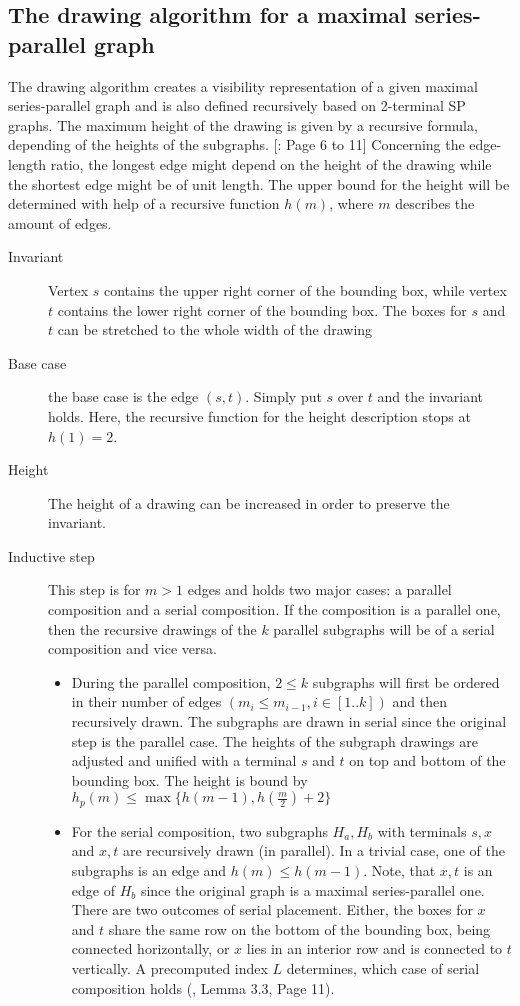 \subsection{The drawing algorithm for a maximal series-parallel graph}
The drawing algorithm creates a visibility representation of a given maximal series-parallel graph and is also defined recursively based on 2-terminal SP graphs. The maximum height of the drawing is given by a recursive formula, depending of the heights of the subgraphs. [\cite{DBLP:journals/dcg/Biedl11}: Page 6 to 11]
Concerning the edge-length ratio, the longest edge might depend on the height of the drawing while the shortest edge might be of unit length. The upper bound for the height will be determined with help of a recursive function $h(m)$, where $m$ describes the amount of edges.
\begin{description}
	\item[Invariant] Vertex $s$ contains the upper right corner of the bounding box, while vertex $t$ contains the lower right corner of the bounding box. The boxes for $s$ and $t$ can be stretched to the whole width of the drawing 
	\item[Base case] the base case is the edge $(s,t)$. Simply put $s$ over $t$ and the invariant holds. Here, the recursive function for the height description stops at $h(1) = 2$.
	\item[Height] The height of a drawing can be increased in order to preserve the invariant. 
	\item[Inductive step] This step is for $m>1$ edges and holds two major cases: a parallel composition and a serial composition. If the composition is a parallel one, then the recursive drawings of the $k$ parallel subgraphs will be of a serial composition and vice versa.
	\begin{itemize}
		\item During the parallel composition, $2\leq k$ subgraphs will first be ordered in their number of edges $(m_i \leq m_{i-1}, i \in[1..k])$ and then recursively drawn. The subgraphs are drawn in serial since the original step is the parallel case. The heights of the subgraph drawings are adjusted and unified with a terminal $s$ and $t$ on top and bottom of the bounding box. The height is bound by $h_p(m)\leq\max\{h(m-1),h\left(\frac{m}{2}\right)+2\}$
		\item For the serial composition, two subgraphs $H_a, H_b$ with terminals  $s,x$ and $x,t$ are recursively drawn (in parallel). In a trivial case, one of the subgraphs is an edge and $h(m)\leq h(m-1)$. Note, that $x,t$ is an edge of $H_b$ since the original graph is a maximal series-parallel one. There are two outcomes of serial placement. Either, the boxes for $x$ and $t$ share the same row on the bottom of the bounding box, being connected horizontally, or $x$ lies in an interior row and is connected to $t$ vertically. A precomputed index $L$ determines, which case of serial composition holds (\cite{DBLP:journals/dcg/Biedl11}, Lemma 3.3, Page 11).

\end{itemize}
\end{description}

